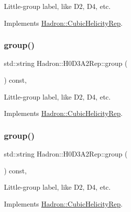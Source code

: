 Little-\/group label, like D2, D4, etc. 

Implements \mbox{\hyperlink{structHadron_1_1CubicHelicityRep_a101a7d76cd8ccdad0f272db44b766113}{Hadron\+::\+Cubic\+Helicity\+Rep}}.

\mbox{\label{structHadron_1_1H0D3A2Rep_a456caa07466fd0a9ea5901d4aeb23e13}} 
\subsubsection{\texorpdfstring{group()}{group()}\hspace{0.1cm}{\footnotesize\ttfamily [3/5]}}
{\footnotesize\ttfamily std\+::string Hadron\+::\+H0\+D3\+A2\+Rep\+::group (\begin{DoxyParamCaption}{ }\end{DoxyParamCaption}) const\hspace{0.3cm}{\ttfamily [inline]}, {\ttfamily [virtual]}}

Little-\/group label, like D2, D4, etc. 

Implements \mbox{\hyperlink{structHadron_1_1CubicHelicityRep_a101a7d76cd8ccdad0f272db44b766113}{Hadron\+::\+Cubic\+Helicity\+Rep}}.

\mbox{\label{structHadron_1_1H0D3A2Rep_a456caa07466fd0a9ea5901d4aeb23e13}} 
\subsubsection{\texorpdfstring{group()}{group()}\hspace{0.1cm}{\footnotesize\ttfamily [4/5]}}
{\footnotesize\ttfamily std\+::string Hadron\+::\+H0\+D3\+A2\+Rep\+::group (\begin{DoxyParamCaption}{ }\end{DoxyParamCaption}) const\hspace{0.3cm}{\ttfamily [inline]}, {\ttfamily [virtual]}}

Little-\/group label, like D2, D4, etc. 

Implements \mbox{\hyperlink{structHadron_1_1CubicHelicityRep_a101a7d76cd8ccdad0f272db44b766113}{Hadron\+::\+Cubic\+Helicity\+Rep}}.

\mbox{\label{structHadron_1_1H0D3A2Rep_a456caa07466fd0a9ea5901d4aeb23e13}} 
